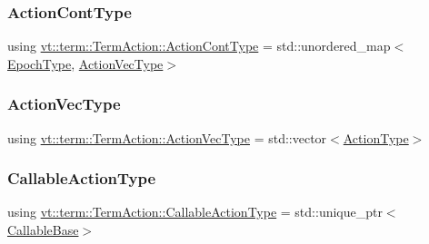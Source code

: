 \subsubsection{\texorpdfstring{Action\+Cont\+Type}{ActionContType}}
{\footnotesize\ttfamily using \hyperlink{structvt_1_1term_1_1_term_action_aec4a5ca3c0b2d9ae23defb65d27d2984}{vt\+::term\+::\+Term\+Action\+::\+Action\+Cont\+Type} =  std\+::unordered\+\_\+map$<$\hyperlink{namespacevt_a81d11b28122d43bf9834577e4a06440f}{Epoch\+Type}, \hyperlink{structvt_1_1term_1_1_term_action_a76d94f79a48ba8367b68f9188784da88}{Action\+Vec\+Type}$>$}

\mbox{\label{structvt_1_1term_1_1_term_action_a76d94f79a48ba8367b68f9188784da88}} 
\subsubsection{\texorpdfstring{Action\+Vec\+Type}{ActionVecType}}
{\footnotesize\ttfamily using \hyperlink{structvt_1_1term_1_1_term_action_a76d94f79a48ba8367b68f9188784da88}{vt\+::term\+::\+Term\+Action\+::\+Action\+Vec\+Type} =  std\+::vector$<$\hyperlink{namespacevt_ae0a5a7b18cc99d7b732cb4d44f46b0f3}{Action\+Type}$>$}

\mbox{\label{structvt_1_1term_1_1_term_action_aa4a32326730b20530526e1db6512c017}} 
\subsubsection{\texorpdfstring{Callable\+Action\+Type}{CallableActionType}}
{\footnotesize\ttfamily using \hyperlink{structvt_1_1term_1_1_term_action_aa4a32326730b20530526e1db6512c017}{vt\+::term\+::\+Term\+Action\+::\+Callable\+Action\+Type} =  std\+::unique\+\_\+ptr$<$\hyperlink{structvt_1_1term_1_1_callable_base}{Callable\+Base}$>$}

\mbox{\label{structvt_1_1term_1_1_term_action_a802aaa899ce87dc9f8a53d43b202044c}} 
